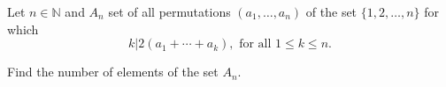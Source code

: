 Let $n \in \mathbb N$ and $A_n$ set of all permutations $(a_1, \ldots, a_n)$ of the set $\{1, 2, \ldots , n\}$ for which\[k|2(a_1 + \cdots+ a_k), \text{ for all } 1 \leq k \leq n.\]

Find the number of elements of the set $A_n$.